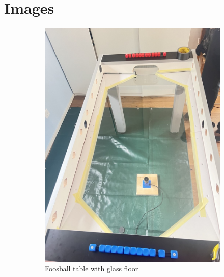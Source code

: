 \section{Images}\label{sec:images}
\begin{figure}
    \centering
    \begin{subfigure}{.5\textwidth}
        \centering
        \includegraphics[width=0.9\linewidth]{../photos/glass_table}
        \caption{Foosball table with glass floor}
        \label{fig:glass_table}
    \end{subfigure}%
    \begin{subfigure}{.5\textwidth}
        \centering

\end{subfigure}
\end{figure}
